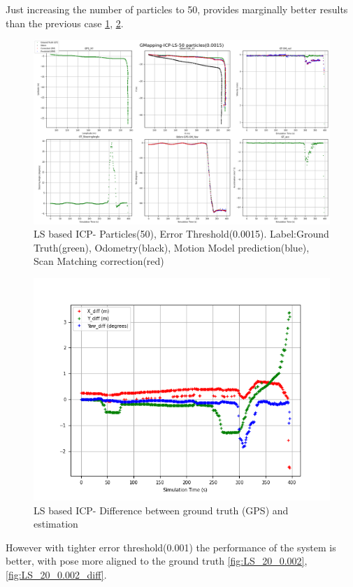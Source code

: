 \clearpage
Just increasing the number of particles to 50, provides marginally better results than the previous case \ref{fig:LS_50_0.0025}, \ref{fig:LS_50_0.0025_diff}.
    \begin{figure}[h] 
        \includegraphics[height=0.6\textwidth]{images/GMapping-ICP-LS-50 particles(0.0015)_PositionParameters.png}
        \caption{LS based ICP- Particles(50), Error Threshold(0.0015). Label:Ground Truth(green), Odometry(black), Motion Model prediction(blue), Scan Matching correction(red)}
        \label{fig:LS_50_0.0025}
    \end{figure}
    \begin{figure}[h] 
        \includegraphics[height=0.4\textwidth]{images/GMapping-ICP-LS-50 particles(0.0015)_True_vs_Crct.png}
        \caption{LS based ICP- Difference between ground truth (GPS) and estimation}
        \label{fig:LS_50_0.0025_diff}
    \end{figure}
\clearpage
However with tighter error threshold(0.001) the performance of the system is better, with pose more aligned to the ground truth \ref{fig:LS_20_0.002}, \ref{fig:LS_20_0.002_diff}.
